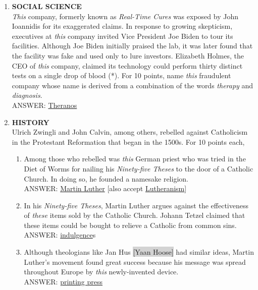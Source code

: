 \documentclass{report}
\newcommand*{\backtrack}{\setcounter{enumi}{\numexpr\theenumi-1\relax}}
\begin{document}
\begin{enumerate}
    \item \textbf{SOCIAL SCIENCE} \\ \textit{This} company, formerly known as \textit{Real-Time Cures} was exposed by John Ioannidis for its exaggerated claims. In response to growing skepticism, executives at \textit{this} company invited Vice President Joe Biden to tour its facilities. Although Joe Biden initially praised the lab, it was later found that the facility was fake and used only to lure investors. Elizabeth Holmes, the CEO of \textit{this} company, claimed its technology could perform thirty distinct tests on a single drop of blood (*). For 10 points, name \textit{this} fraudulent company whose name is derived from a combination of the words \textit{therapy} and \textit{diagnosis}. \\ ANSWER: \underline{Theranos} \backtrack
    \item \textbf{HISTORY} \\ Ulrich Zwingli and John Calvin, among others, rebelled against Catholicism in the Protestant Reformation that began in the 1500s. For 10 points each,
    \begin{enumerate}[label=\Alph*]
        \item Among those who rebelled was \textit{this} German priest who was tried in the Diet of Worms for nailing his \textit{Ninety-five Theses} to the door of a Catholic Church. In doing so, he founded a namesake religion. \\ ANSWER: \underline{Martin Luther} [also accept \underline{Lutheranism}]
        \item In his \textit{Ninety-five Theses}, Martin Luther argues against the effectiveness of \textit{these} items sold by the Catholic Church. Johann Tetzel claimed that these items could be bought to relieve a Catholic from common sins. \\ ANSWER: \underline{indulgence}s
        \item Although theologians like Jan Hus \colorbox{lightGray}{[Yaan Hoose]} had similar ideas, Martin Luther's movement found great success because his message was spread throughout Europe by \textit{this} newly-invented device. \\ ANSWER: \underline{printing press}
    \end{enumerate}


\end{enumerate}
\end{document}
